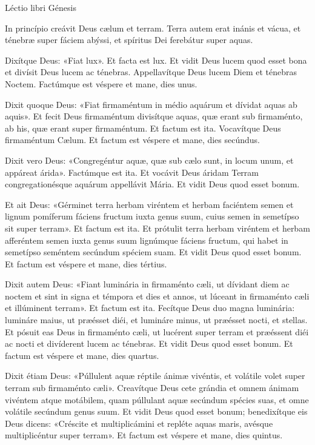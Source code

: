 
Léctio libri Génesis

In princípio creávit Deus cælum et terram. Terra autem erat inánis et vácua, et ténebræ super fáciem abýssi, et spíritus Dei ferebátur super aquas. 

Dixítque Deus: «Fiat lux». Et facta est lux.
Et vidit Deus lucem quod esset bona et divísit Deus lucem ac ténebras. 
Appellavítque Deus lucem Diem et ténebras Noctem.
Factúmque est véspere et mane, dies unus.

Dixit quoque Deus: «Fiat firmaméntum in médio aquárum et dívidat aquas ab aquis». Et fecit Deus firmaméntum divisítque aquas, quæ erant sub firmaménto, ab his, quæ erant super firmaméntum. Et factum est ita.
Vocavítque Deus firmaméntum Cælum. Et factum est véspere et mane, dies secúndus.

Dixit vero Deus: «Congregéntur aquæ, quæ sub cælo sunt, in locum unum, et appáreat árida». Factúmque est ita. 
Et vocávit Deus áridam Terram congregationésque aquárum appellávit Mária. Et vidit Deus quod esset bonum.

Et ait Deus: «Gérminet terra herbam viréntem et herbam faciéntem semen et lignum pomíferum fáciens fructum iuxta genus suum, cuius semen in semetípso sit super terram». Et factum est ita.
Et prótulit terra herbam viréntem et herbam afferéntem semen iuxta genus suum lignúmque fáciens fructum, qui habet in semetípso seméntem secúndum spéciem suam. Et vidit Deus quod esset bonum. Et factum est véspere et mane, dies tértius.

Dixit autem Deus: «Fiant luminária in firmaménto cæli, ut dívidant diem ac noctem et sint in signa et témpora et dies et annos, ut lúceant in firmaménto cæli et illúminent terram». Et factum est ita. 
Fecítque Deus duo magna luminária: lumináre maius, ut præésset diéi, et lumináre minus, ut præésset nocti, et stellas.
Et pósuit eas Deus in firmaménto cæli, ut lucérent super terram et præéssent diéi ac nocti et divíderent lucem ac ténebras. Et vidit Deus quod esset bonum.
Et factum est véspere et mane, dies quartus.

Dixit étiam Deus: «Púllulent aquæ réptile ánimæ vivéntis, et volátile volet super terram sub firmaménto cæli». Creavítque Deus cete grándia et omnem ánimam vivéntem atque motábilem, quam púllulant aquæ secúndum spécies suas, et omne volátile secúndum genus suum. Et vidit Deus quod esset bonum; benedixítque eis Deus dicens: «Créscite et multiplicámini et repléte aquas maris, avésque multiplicéntur super terram». Et factum est véspere et mane, dies quintus.

